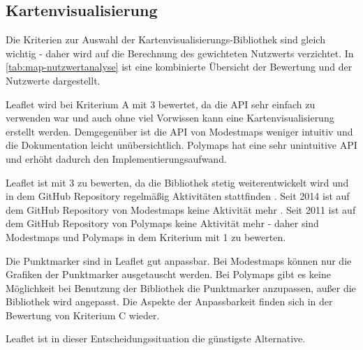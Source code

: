 \subsection{Kartenvisualisierung}
\label{sec:kartenvisualisierung}
Die Kriterien zur Auswahl der Kartenvisualisierungs-Bibliothek sind gleich wichtig - daher wird auf die Berechnung des gewichteten Nutzwerts verzichtet.
In \autoref{tab:map-nutzwertanalyse} ist eine kombinierte Übersicht der Bewertung und der Nutzwerte dargestellt.

Leaflet wird bei Kriterium A mit 3 bewertet, da die API sehr einfach zu verwenden war und auch ohne viel Vorwissen kann eine Kartenvisualisierung erstellt werden.
Demgegenüber ist die API von Modestmaps weniger intuitiv und die Dokumentation leicht unübersichtlich.
Polymaps hat eine sehr unintuitive API und erhöht dadurch den Implementierungsaufwand.

Leaflet ist mit 3 zu bewerten, da die Bibliothek stetig weiterentwickelt wird und in dem GitHub Repository regelmäßig Aktivitäten stattfinden \autocite[vgl.][]{leaflet.od}.
Seit 2014 ist auf dem GitHub Repository von Modestmaps keine Aktivität mehr \autocite[vgl.][]{modestmaps.od}.
Seit 2011 ist auf dem GitHub Repository von Polymaps keine Aktivität mehr \autocite[vgl.][]{airship.od} - daher sind Modestmaps und Polymaps in dem Kriterium mit 1 zu bewerten.

Die Punktmarker sind in Leaflet gut anpassbar.
Bei Modestmaps können nur die Grafiken der Punktmarker ausgetauscht werden.
Bei Polymaps gibt es keine Möglichkeit bei Benutzung der Bibliothek die Punktmarker anzupassen, außer die Bibliothek wird angepasst.
Die Aspekte der Anpassbarkeit finden sich in der Bewertung von Kriterium C wieder.

Leaflet ist in dieser Entscheidungssituation die günstigste Alternative.

